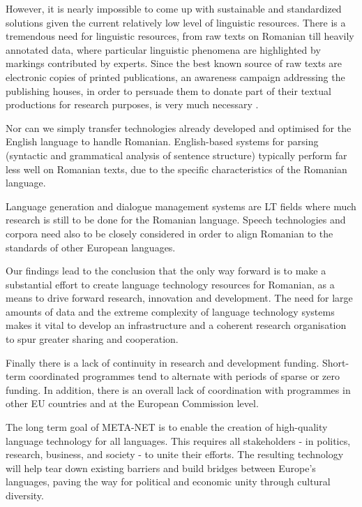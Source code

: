 \documentclass[]{../../metanetpaper}
\begin{document}
\begin{multicols}{2}
However, it is nearly impossible to come up with sustainable and standardized solutions given the current relatively low level of linguistic resources. There is a tremendous need for linguistic resources, from raw texts on Romanian till heavily annotated data, where particular linguistic phenomena are highlighted by markings contributed by experts. Since the best known source of raw texts are electronic copies of printed publications, an awareness campaign addressing the publishing houses, in order to persuade them to donate part of their textual productions for research purposes, is very much necessary \cite{cristea4}.

Nor can we simply transfer technologies already developed and optimised for the English language to handle Romanian. English-based systems for parsing (syntactic and grammatical analysis of sentence structure) typically perform far less well on Romanian texts, due to the specific characteristics of the Romanian language.

Language generation and dialogue management systems are LT fields where much research is still to be done for the Romanian language. Speech technologies and corpora need also to be closely considered in order to align Romanian to the standards of other European languages.

Our findings lead to the conclusion that the only way forward is to make a substantial effort to create language technology resources for Romanian, as a means to drive forward research, innovation and development. The need for large amounts of data and the extreme complexity of language technology systems makes it vital to develop an infrastructure and a coherent research organisation to spur greater sharing and cooperation.

Finally there is a lack of continuity in research and development funding. Short-term coordinated programmes tend to alternate with periods of sparse or zero funding. In addition, there is an overall lack of coordination with programmes in other EU countries and at the European Commission level.

The long term goal of META-NET is to enable the creation of high-quality language technology for all languages. This requires all stakeholders - in politics, research, business, and society - to unite their efforts. The resulting technology will help tear down existing barriers and build bridges between Europe’s languages, paving the way for political and economic unity through cultural diversity. 

\end{multicols}
\end{document}
